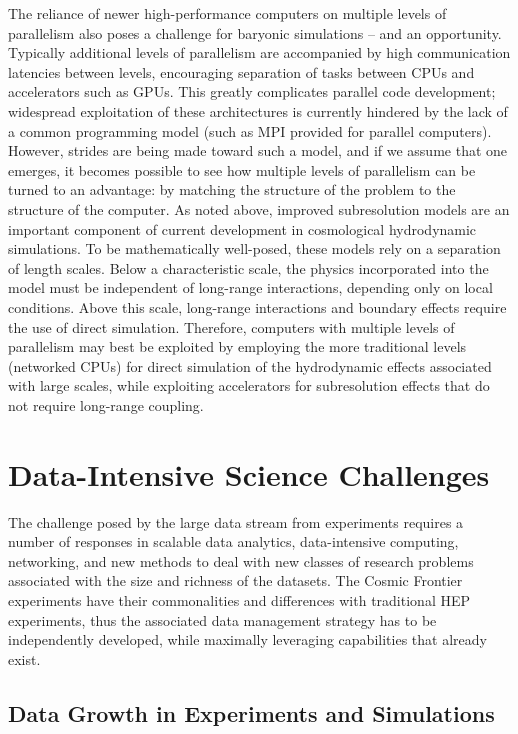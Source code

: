 The reliance of newer high-performance computers on multiple levels of
parallelism also poses a challenge for baryonic simulations -- and an
opportunity. Typically additional levels of parallelism are
accompanied by high communication latencies between levels,
encouraging separation of tasks between CPUs and accelerators such as
GPUs. This greatly complicates parallel code development; widespread
exploitation of these architectures is currently hindered by the lack
of a common programming model (such as MPI provided for parallel
computers). However, strides are being made toward such a model, and
if we assume that one emerges, it becomes possible to see how multiple
levels of parallelism can be turned to an advantage: by matching the
structure of the problem to the structure of the computer. As noted
above, improved subresolution models are an important component of
current development in cosmological hydrodynamic simulations. To be
mathematically well-posed, these models rely on a separation of length
scales. Below a characteristic scale, the physics incorporated into
the model must be independent of long-range interactions, depending
only on local conditions. Above this scale, long-range interactions
and boundary effects require the use of direct simulation. Therefore,
computers with multiple levels of parallelism may best be exploited by
employing the more traditional levels (networked CPUs) for direct
simulation of the hydrodynamic effects associated with large scales,
while exploiting accelerators for subresolution effects that do not
require long-range coupling.

\section{Data-Intensive Science Challenges}


The challenge posed by the large data stream from experiments requires
a number of responses in scalable data analytics, data-intensive
computing, networking, and new methods to deal with new classes of
research problems associated with the size and richness of the datasets. The Cosmic Frontier experiments have their commonalities and
differences with traditional HEP experiments, thus the associated data
management strategy has to be independently developed, while maximally
leveraging capabilities that already exist.

\subsection{Data Growth in Experiments and Simulations}

